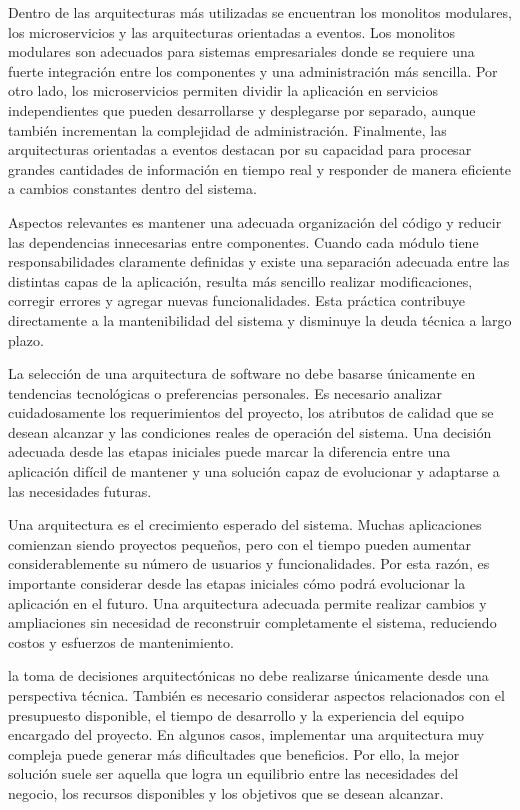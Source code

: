 \documentclass[12pt,letterpaper]{article}
\begin{document}
Dentro de las arquitecturas más utilizadas se encuentran los monolitos modulares, los microservicios y las arquitecturas orientadas a eventos. Los monolitos modulares son adecuados para sistemas empresariales donde se requiere una fuerte integración entre los componentes y una administración más sencilla. Por otro lado, los microservicios permiten dividir la aplicación en servicios independientes que pueden desarrollarse y desplegarse por separado, aunque también incrementan la complejidad de administración. Finalmente, las arquitecturas orientadas a eventos destacan por su capacidad para procesar grandes cantidades de información en tiempo real y responder de manera eficiente a cambios constantes dentro del sistema.

Aspectos relevantes es mantener una adecuada organización del código y reducir las dependencias innecesarias entre componentes. Cuando cada módulo tiene responsabilidades claramente definidas y existe una separación adecuada entre las distintas capas de la aplicación, resulta más sencillo realizar modificaciones, corregir errores y agregar nuevas funcionalidades. Esta práctica contribuye directamente a la mantenibilidad del sistema y disminuye la deuda técnica a largo plazo.

La selección de una arquitectura de software no debe basarse únicamente en tendencias tecnológicas o preferencias personales. Es necesario analizar cuidadosamente los requerimientos del proyecto, los atributos de calidad que se desean alcanzar y las condiciones reales de operación del sistema. Una decisión adecuada desde las etapas iniciales puede marcar la diferencia entre una aplicación difícil de mantener y una solución capaz de evolucionar y adaptarse a las necesidades futuras.

Una arquitectura es el crecimiento esperado del sistema. Muchas aplicaciones comienzan siendo proyectos pequeños, pero con el tiempo pueden aumentar considerablemente su número de usuarios y funcionalidades. Por esta razón, es importante considerar desde las etapas iniciales cómo podrá evolucionar la aplicación en el futuro. Una arquitectura adecuada permite realizar cambios y ampliaciones sin necesidad de reconstruir completamente el sistema, reduciendo costos y esfuerzos de mantenimiento.

la toma de decisiones arquitectónicas no debe realizarse únicamente desde una perspectiva técnica. También es necesario considerar aspectos relacionados con el presupuesto disponible, el tiempo de desarrollo y la experiencia del equipo encargado del proyecto. En algunos casos, implementar una arquitectura muy compleja puede generar más dificultades que beneficios. Por ello, la mejor solución suele ser aquella que logra un equilibrio entre las necesidades del negocio, los recursos disponibles y los objetivos que se desean alcanzar.
\end{document}
